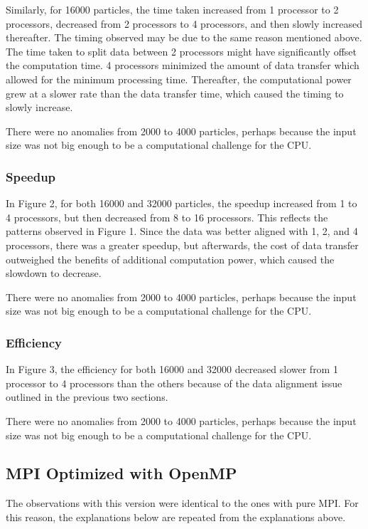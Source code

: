 \documentclass{article}
\begin{document}
Similarly, for 16000 particles, the time taken increased from 1 processor to 2 processors, decreased from 2 processors to 4 processors, and then slowly increased thereafter. The timing observed may be due to the same reason mentioned above. The time taken to split data between 2 processors might have significantly offset the computation time. 4 processors minimized the amount of data transfer which allowed for the minimum processing time. Thereafter, the computational power grew at a slower rate than the data transfer time, which caused the timing to slowly increase.

There were no anomalies from 2000 to 4000 particles, perhaps because the input size was not big enough to be a computational challenge for the CPU.

\subsubsection{Speedup}
In Figure 2, for both 16000 and 32000 particles, the speedup increased from 1 to 4 processors, but then decreased from 8 to 16 processors. This reflects the patterns observed in Figure 1. Since the data was better aligned with 1, 2, and 4 processors, there was a greater speedup, but afterwards, the cost of data transfer outweighed the benefits of additional computation power, which caused the slowdown to decrease.

There were no anomalies from 2000 to 4000 particles, perhaps because the input size was not big enough to be a computational challenge for the CPU.

\subsubsection{Efficiency}
In Figure 3, the efficiency for both 16000 and 32000 decreased slower from 1 processor to 4 processors than the others because of the data alignment issue outlined in the previous two sections. 

There were no anomalies from 2000 to 4000 particles, perhaps because the input size was not big enough to be a computational challenge for the CPU.

\subsection{MPI Optimized with OpenMP}
The observations with this version were identical to the ones with pure MPI. For this reason, the explanations below are repeated from the explanations above. 
\end{document}
